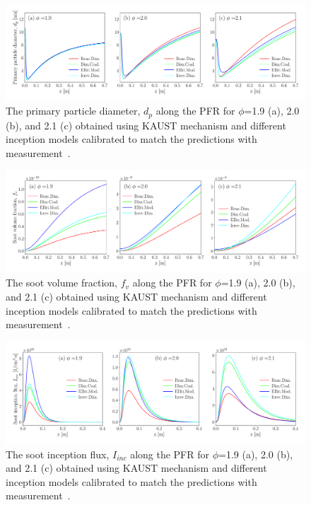 \begin{figure}[H]
	\centering
	\includegraphics[width=1\textwidth]{Figures/Results/PSR/d_p_eq_ratio_all_single_mech.pdf}
	\caption{The primary particle diameter, $d_p$ along the PFR for $\phi$=1.9 (a), 2.0 (b), and 2.1 (c) obtained using KAUST mechanism and different inception models calibrated to match the predictions with measurement~\citep{manzello2007soot}.}
	\label{fig:psrpfr_dp} 
\end{figure}

\begin{figure}[H]
	\centering
	\includegraphics[width=1\textwidth]{Figures/Results/PSR/f_v_eq_ratio_all_single_mech.pdf}
	\caption{The soot volume fraction, $f_v$ along the PFR for $\phi$=1.9 (a), 2.0 (b), and 2.1 (c) obtained using KAUST mechanism and different inception models calibrated to match the predictions with measurement~\citep{manzello2007soot}.}
	\label{fig:psrpfr_fv} 
\end{figure}

\begin{figure}[H]
	\centering
	\includegraphics[width=1\textwidth]{Figures/Results/PSR/I_inc_eq_ratio_all_single_mech.pdf}
	\caption{The soot inception flux, $I_{inc}$ along the PFR for $\phi$=1.9 (a), 2.0 (b), and 2.1 (c) obtained using KAUST mechanism and different inception models calibrated to match the predictions with measurement~\citep{manzello2007soot}.}
	\label{fig:psrpfr_Iinc} 
\end{figure}

